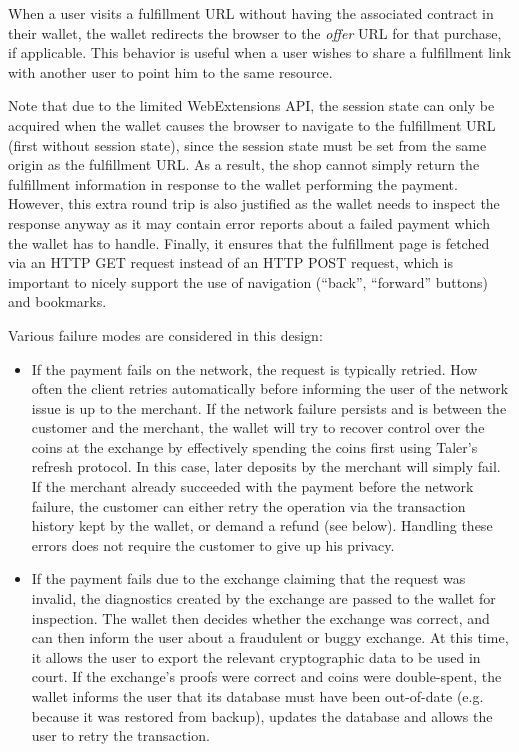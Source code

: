 \documentclass{llncs}
\begin{document}
When a user visits a fulfillment URL without having the associated
contract in their wallet, the wallet redirects the browser to the {\em
  offer} URL for that purchase, if applicable.  This behavior is
useful when a user wishes to share a fulfillment link with another
user to point him to the same resource.

Note that due to the limited WebExtensions API, the session state can
only be acquired when the wallet causes the browser to navigate to the
fulfillment URL (first without session state), since the session state
must be set from the same origin as the fulfillment URL.  As a result,
the shop cannot simply return the fulfillment information in response
to the wallet performing the payment.  However, this extra round trip
is also justified as the wallet needs to inspect the response anyway
as it may contain error reports about a failed payment which the wallet
has to handle.  Finally, it ensures that the fulfillment page is fetched
via an HTTP GET request instead of an HTTP POST request, which is
important to nicely support the use of navigation (``back'', ``forward''
buttons) and bookmarks.

Various failure modes are considered in this design:

\begin{itemize}
\item If the payment fails on the network, the request is typically
 retried.  How often the client retries automatically before informing
 the user of the network issue is up to the merchant.  If the network
 failure persists and is between the customer and the merchant, the wallet
 will try to recover control over the coins at the exchange by
 effectively spending the coins first using Taler's
 refresh protocol.  In this case, later deposits by the merchant
 will simply fail.  If the merchant already succeeded with the payment
 before the network failure, the customer can either retry the
 operation via the transaction history kept by the wallet, or demand a refund (see
 below).  Handling these errors does not require the customer to give
 up his privacy.
\item If the payment fails due to the exchange
 claiming that the request was invalid, the diagnostics created by the
 exchange are passed to the wallet for inspection.  The wallet then
 decides whether the exchange was correct, and can then inform the
 user about a fraudulent or buggy exchange.  At this time, it allows
 the user to export the relevant cryptographic data to be used in
 court.  If the exchange's proofs were correct and coins were
 double-spent, the wallet informs the user that its database must have
 been out-of-date (e.g. because it was restored from backup),
 updates the database and allows the user to retry
 the transaction.
\end{itemize}
\end{document}
